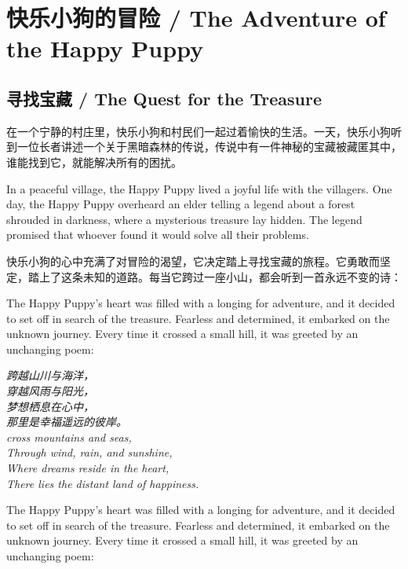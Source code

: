 \chapter*{快乐小狗的冒险 / The Adventure of the Happy Puppy}

\section*{寻找宝藏 / The Quest for the Treasure}

在一个宁静的村庄里，快乐小狗和村民们一起过着愉快的生活。一天，快乐小狗听到一位长者讲述一个关于黑暗森林的传说，传说中有一件神秘的宝藏被藏匿其中，谁能找到它，就能解决所有的困扰。

\begin{flushright}
In a peaceful village, the Happy Puppy lived a joyful life with the villagers. One day, the Happy Puppy overheard an elder telling a legend about a forest shrouded in darkness, where a mysterious treasure lay hidden. The legend promised that whoever found it would solve all their problems.
\end{flushright}

快乐小狗的心中充满了对冒险的渴望，它决定踏上寻找宝藏的旅程。它勇敢而坚定，踏上了这条未知的道路。每当它跨过一座小山，都会听到一首永远不变的诗：

The Happy Puppy’s heart was filled with a longing for adventure, and it decided to set off in search of the treasure. Fearless and determined, it embarked on the unknown journey. Every time it crossed a small hill, it was greeted by an unchanging poem:

\begin{center}
    \textit{
    跨越山川与海洋，\\
    穿越风雨与阳光，\\
    梦想栖息在心中，\\
    那里是幸福遥远的彼岸。 \\
    cross mountains and seas,\\
    Through wind, rain, and sunshine,\\
    Where dreams reside in the heart,\\
    There lies the distant land of happiness.
    }
    \end{center}

\begin{flushright}
The Happy Puppy’s heart was filled with a longing for adventure, and it decided to set off in search of the treasure. Fearless and determined, it embarked on the unknown journey. Every time it crossed a small hill, it was greeted by an unchanging poem:
\end{flushright}

